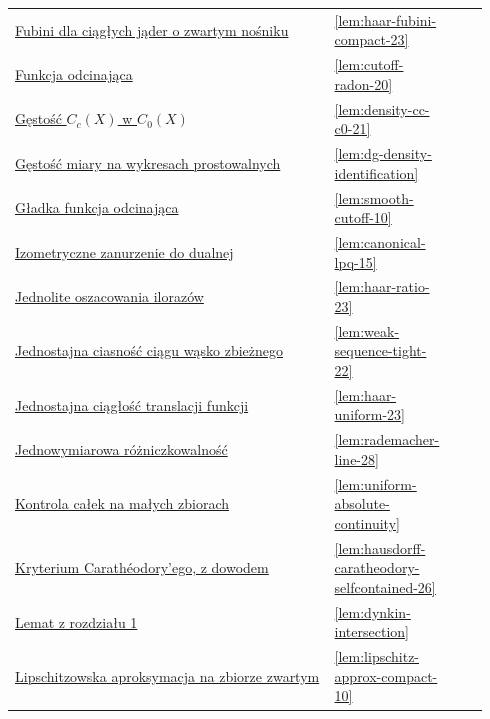 \documentclass[11pt,a4paper,oneside]{book}
\numberwithin{equation}{chapter}
\theoremstyle{plain}
\theoremstyle{definition}
\theoremstyle{remark}
\begin{document}
\begin{longtable}{@{}p{0.72\linewidth}p{0.135\linewidth}p{0.08\linewidth}@{}}
\hyperref[lem:haar-fubini-compact-23]{Fubini dla ciągłych jąder o zwartym nośniku} & \ref*{lem:haar-fubini-compact-23} & \pageref*{lem:haar-fubini-compact-23} \\
\hyperref[lem:cutoff-radon-20]{Funkcja odcinająca} & \ref*{lem:cutoff-radon-20} & \pageref*{lem:cutoff-radon-20} \\
\hyperref[lem:density-cc-c0-21]{Gęstość $C_c(X)$ w $C_0(X)$} & \ref*{lem:density-cc-c0-21} & \pageref*{lem:density-cc-c0-21} \\
\hyperref[lem:dg-density-identification]{Gęstość miary na wykresach prostowalnych} & \ref*{lem:dg-density-identification} & \pageref*{lem:dg-density-identification} \\
\hyperref[lem:smooth-cutoff-10]{Gładka funkcja odcinająca} & \ref*{lem:smooth-cutoff-10} & \pageref*{lem:smooth-cutoff-10} \\
\hyperref[lem:canonical-lpq-15]{Izometryczne zanurzenie do dualnej} & \ref*{lem:canonical-lpq-15} & \pageref*{lem:canonical-lpq-15} \\
\hyperref[lem:haar-ratio-23]{Jednolite oszacowania ilorazów} & \ref*{lem:haar-ratio-23} & \pageref*{lem:haar-ratio-23} \\
\hyperref[lem:weak-sequence-tight-22]{Jednostajna ciasność ciągu wąsko zbieżnego} & \ref*{lem:weak-sequence-tight-22} & \pageref*{lem:weak-sequence-tight-22} \\
\hyperref[lem:haar-uniform-23]{Jednostajna ciągłość translacji funkcji} & \ref*{lem:haar-uniform-23} & \pageref*{lem:haar-uniform-23} \\
\hyperref[lem:rademacher-line-28]{Jednowymiarowa różniczkowalność} & \ref*{lem:rademacher-line-28} & \pageref*{lem:rademacher-line-28} \\
\hyperref[lem:uniform-absolute-continuity]{Kontrola całek na małych zbiorach} & \ref*{lem:uniform-absolute-continuity} & \pageref*{lem:uniform-absolute-continuity} \\
\hyperref[lem:hausdorff-caratheodory-selfcontained-26]{Kryterium Carathéodory'ego, z dowodem} & \ref*{lem:hausdorff-caratheodory-selfcontained-26} & \pageref*{lem:hausdorff-caratheodory-selfcontained-26} \\
\hyperref[lem:dynkin-intersection]{Lemat z rozdziału 1} & \ref*{lem:dynkin-intersection} & \pageref*{lem:dynkin-intersection} \\
\hyperref[lem:lipschitz-approx-compact-10]{Lipschitzowska aproksymacja na zbiorze zwartym} & \ref*{lem:lipschitz-approx-compact-10} & \pageref*{lem:lipschitz-approx-compact-10} \\

\end{longtable}
\end{document}
